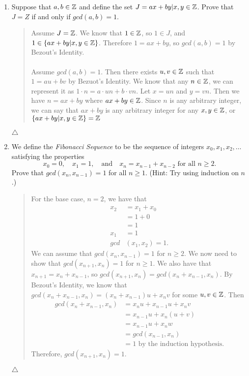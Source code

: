 \documentclass{hw}
\begin{document}

\begin{enumerate}
\item Suppose that $a,b\in\mathbb{Z}$ and define the set $J={ax+by|x,y\in\mathbb{Z}}$. Prove that $J=Z$ if and only if
$gcd(a, b) = 1$.
\begin{quote}
Assume $J=\mathbb{Z}$. We know that $1\in\mathbb{Z}$, so $1\in J$, and $1\in\{ax+by|x,y\in\mathbb{Z}\}$. Therefore
$1=ax+by$, so $gcd(a,b)=1$ by Bezout's Identity.\\\\
Assume $gcd(a,b)=1$. Then there exists $u,v\in\mathbb{Z}$ such that $1 = au+bv$ by Bezuot's Identity. We know
that any $n\in\mathbb{Z}$, we can represent it as $1\cdot n = a\cdot un + b\cdot vn$. Let $x=un$ and $y=vn$.
Then we have $n = ax+by$ where $ax+by\in\mathbb{Z}$. Since $n$ is any arbitrary integer, we can say that
$ax+by$ is any arbitrary integer for any $x,y\in\mathbb{Z}$, or $\{ax+by|x,y\in\mathbb{Z}\}=\mathbb{Z}$
\end{quote}
$\triangle$

\item We define the \textit{Fibonacci Sequence} to be the sequence of integers
${x_{0}, x_{1}, x_{2},\dots}$
satisfying the properties
\[
x_{0} = 0,\quad x_{1} = 1,\quad\text{and}\quad x_{n} = x_{n-1}+x_{n-2}\text{ for all } n\geq2.
\]
Prove that $gcd(x_{n},x_{n-1}) = 1$ for all $n \geq 1$. (Hint: Try using induction on $n$.)
\begin{quote}
For the base case, $n=2$, we have that
\begin{align*}
x_{2} &= x_{1} + x_{0}\\
&= 1 + 0\\
&= 1\\
x_{1} &= 1\\
gcd&(x_{1},x_{2})= 1.
\end{align*}
We can assume that $gcd(x_{n},x_{n-1}) = 1$ for $n\geq2$. We now need to show that
$gcd(x_{n+1},x_{n}) = 1$ for $n\geq1$. We also have that $x_{n+1}=x_{n}+x_{n-1}$,
so $gcd(x_{n+1},x_{n}) = gcd(x_{n}+x_{n-1},x_{n})$. By Bezout's Identity, we know that
$gcd(x_{n}+x_{n-1},x_{n}) = (x_{n}+x_{n-1})u + x_{n}v$ for some $u,v\in\mathbb{Z}$. Then
\begin{align*}
gcd(x_{n}+x_{n-1},x_{n}) &= x_{n}u+x_{n-1}u + x_{n}v\\
&= x_{n-1}u + x_{n}(u+v)\\
&= x_{n-1}u + x_{n}w\\
&= gcd(x_{n-1},x_{n})\\
&= 1\text{ by the induction hypothesis}.
\end{align*}
Therefore, $gcd(x_{n+1},x_{n}) = 1$.
\end{quote}
$\triangle$


\end{enumerate}
\end{document}
